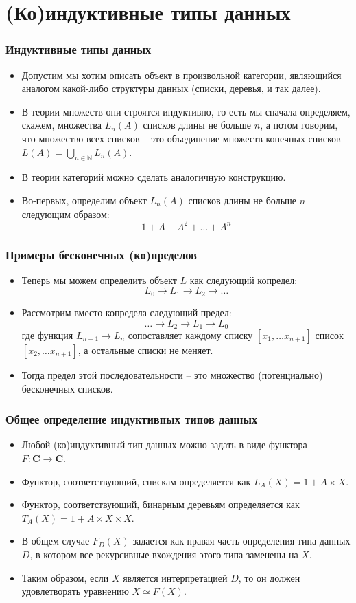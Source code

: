 \documentclass{beamer}
\theoremstyle{definition}
\newcommand{\cat}[1]{\mathbf{#1}}
\renewcommand{\C}{\cat{C}}
\begin{document}
\section{(Ко)индуктивные типы данных}

\begin{frame}
\frametitle{Индуктивные типы данных}
\begin{itemize}
\item Допустим мы хотим описать объект в произвольной категории, являющийся аналогом какой-либо структуры данных (списки, деревья, и так далее).
\item В теории множеств они строятся индуктивно, то есть мы сначала определяем, скажем, множества $L_n(A)$ списков длины не больше $n$, а потом говорим, что множество всех списков -- это объединение множеств конечных списков $L(A) = \bigcup_{n \in \mathbb{N}} L_n(A)$.
\item В теории категорий можно сделать аналогичную конструкцию.
\item Во-первых, определим объект $L_n(A)$ списков длины не больше $n$ следующим образом:
\[ 1 + A + A^2 + \ldots + A^n \]
\end{itemize}
\end{frame}

\begin{frame}
\frametitle{Примеры бесконечных (ко)пределов}
\begin{itemize}
\item Теперь мы можем определить объект $L$ как следующий копредел:
\[ L_0 \to L_1 \to L_2 \to \ldots \]
\item Рассмотрим вместо копредела следующий предел:
\[ \ldots \to L_2 \to L_1 \to L_0 \]
где функция $L_{n+1} \to L_n$  сопоставляет каждому списку $[x_1, \ldots x_{n+1}]$ список $[x_2, \ldots x_{n+1}]$, а остальные списки не меняет.
\item Тогда предел этой последовательности -- это множество (потенциально) бесконечных списков.
\end{itemize}
\end{frame}

\begin{frame}
\frametitle{Общее определение индуктивных типов данных}
\begin{itemize}
\item Любой (ко)индуктивный тип данных можно задать в виде функтора $F : \C \to \C$.
\item Функтор, соответствующий, спискам определяется как $L_A(X) = 1 + A \times X$.
\item Функтор, соответствующий, бинарным деревьям определяется как $T_A(X) = 1 + A \times X \times X$.
\item В общем случае $F_D(X)$ задается как правая часть определения типа данных $D$, в котором все рекурсивные вхождения этого типа заменены на $X$.
\item Таким образом, если $X$ является интерпретацией $D$, то он должен удовлетворять уравнению $X \simeq F(X)$.
\end{itemize}
\end{frame}
\end{document}
